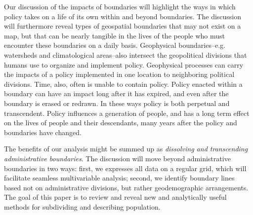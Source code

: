 \documentclass[draft]{article}
\begin{document}

Our discussion of the impacts of boundaries will highlight the ways in which policy takes on a life of its own within and beyond boundaries.  The discussion will furthermore reveal types of geospatial boundaries that may not exist on a map, but that can be nearly tangible in the lives of the people who must encounter these boundaries on a daily basis.  %
Geophysical boundaries--e.g. watersheds and climatological areas--also intersect the geopolitical divisions that humans use to organize and implement policy.  Geophysical processes can carry the impacts of a policy implemented in one location to neighboring political divisions.  Time, also, often is unable to contain policy.  Policy enacted within a boundary can have an impact long after it has expired, and even after the boundary is erased or redrawn.  In these ways policy is both perpetual and transcendent.  Policy influences a generation of people, and has a long term effect on the lives of people and their descendants, many years after the policy and boundaries have changed.

The benefits of our analysis might be summed up as {\em dissolving and transcending administrative boundaries}.  The discussion will move beyond administrative boundaries in two ways:  first, we expresses all data on a regular grid, which will facilitate seamless multivariable analysis; second, we identify boundary lines based not on administrative divisions, but rather geodemographic arrangements.  The goal of this paper is to review and reveal new and analytically useful methods for subdividing and describing population.  
\end{document}
